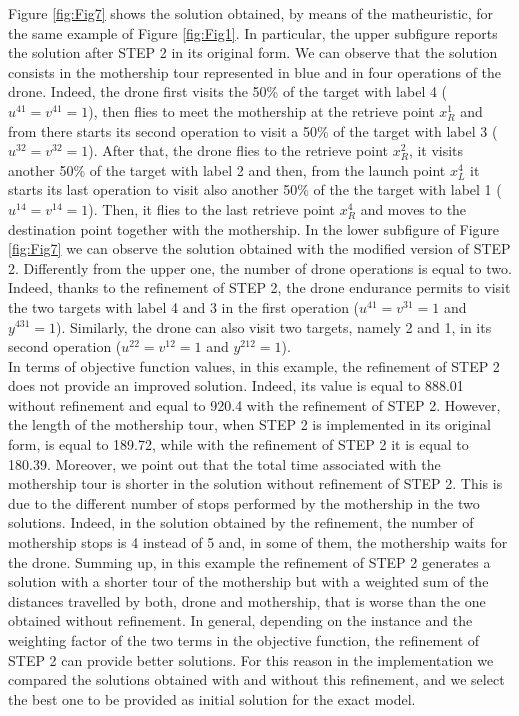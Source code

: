 \documentclass{itor}
\theoremstyle{definition}
\theoremstyle{remark}
\begin{document}
Figure \ref{fig:Fig7} shows the solution obtained, by means of the matheuristic, for the same example of Figure \ref{fig:Fig1}. In particular, the upper subfigure reports the solution after STEP 2 in its original form. We can observe that the solution consists in the mothership tour represented in blue and in four operations of the drone. Indeed, the drone first visits the 50\% of the target with label 4 ($u^{41}=v^{41}=1$), then flies to meet the mothership at the retrieve point $x_R^1$ and from there starts its second operation to visit a 50\% of the target with label 3 ($u^{32}=v^{32}=1$). After that, the drone flies to the retrieve point $x_R^2$, it visits another 50\% of the target with label 2 and then, from the launch point $x_L^4$ it starts its last operation to visit also another 50\% of the the target with label 1 ($u^{14}=v^{14}=1$). Then, it flies to the last retrieve point $x_R^4$ and moves to the destination point together with the mothership.
In the lower subfigure of Figure \ref{fig:Fig7} we can observe the solution obtained with the modified version of STEP 2. Differently from the upper one, the number of drone operations is equal to two. Indeed, thanks to the refinement of STEP 2, the drone endurance permits to visit the two targets with label 4 and 3 in the first operation  ($u^{41}=v^{31}=1$ and $y^{431}=1$). Similarly, the drone can also visit two targets, namely 2 and 1, in its second operation ($u^{22}=v^{12}=1$ and $y^{212}=1$).\\ 
In terms of objective function values, in this example, the refinement of STEP 2 does not provide an improved solution. Indeed, its value is equal to 888.01 without refinement and equal to 920.4 with the refinement of STEP 2. 
However, the length of the mothership tour, when STEP 2 is implemented in its original form, is equal to 189.72, while with the refinement of STEP 2 it is equal to 180.39. 
Moreover, we point out that the total time associated with the mothership tour is shorter in the solution without refinement of STEP 2. This is due to the different number of stops performed by the mothership in the two solutions. Indeed, in the solution obtained by the refinement, the number of mothership stops is 4 instead of 5 and, in some of them, the mothership waits for the drone. Summing up, in this example the refinement of STEP 2 generates a solution with a shorter tour of the mothership but with a weighted sum of the distances travelled by both, drone and mothership, that is worse than the one obtained without refinement. In general, depending on the instance and the weighting factor of the two terms in the objective function, the refinement of STEP 2 can provide better solutions. For this reason in the implementation we compared the solutions obtained with and without this refinement, and we select the best one to be provided as initial solution for the exact model.
\end{document}
